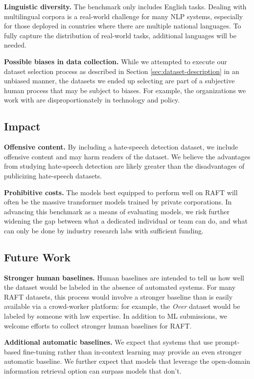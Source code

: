 \documentclass{article}
\newcommand{\name}{\textsc{RAFT}}
\begin{document}
\textbf{Linguistic diversity.} The benchmark only includes English tasks. Dealing with multilingual corpora is a real-world challenge for many NLP systems, especially for those deployed in countries where there are multiple national languages. To fully capture the distribution of real-world tasks, additional languages will be needed.

\textbf{Possible biases in data collection.} While we attempted to execute our dataset selection process as described in Section \ref{sec:dataset-description} in an unbiased manner, the datasets we ended up selecting are part of a subjective human process that may be subject to biases. For example, the organizations we work with are disproportionately in technology and policy.

\subsection{Impact}

\textbf{Offensive content.} By including a hate-speech detection dataset, we include offensive content and may harm readers of the dataset. We believe the advantages from studying hate-speech detection are likely greater than the disadvantages of publicizing hate-speech datasets.

\textbf{Prohibitive costs.} The models best equipped to perform well on RAFT will often be the massive transformer models trained by private corporations. In advancing this benchmark as a means of evaluating models, we risk further widening the gap between what a dedicated individual or team can do, and what can only be done by industry research labs with sufficient funding.

\subsection{Future Work}

\textbf{Stronger human baselines.} Human baselines are intended to tell us how well the dataset would be labeled in the absence of automated systems. For many \name{} datasets, this process would involve a stronger baseline than is easily available via a crowd-worker platform: for example, the \textit{Over} dataset would be labeled by someone with law expertise. In addition to ML submissions, we welcome efforts to collect stronger human baselines for \name{}.

\textbf{Additional automatic baselines.} We expect that systems that use prompt-based fine-tuning rather than in-context learning may provide an even stronger automatic baseline. We further expect that models that leverage the open-domain information retrieval option can surpass models that don't.
\end{document}
